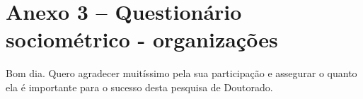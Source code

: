 \documentclass[a4paper, 12pt, openright, oneside, german, french, english, brazil]{abntex2}
\begin{document}
	

	
	
	
	\chapter*[Anexo 3]{Anexo 3 -- Questionário sociométrico - organizações}

	
	
	Bom dia. Quero agradecer muitíssimo pela sua participação e assegurar o quanto ela é importante para o sucesso desta pesquisa de Doutorado.
	
\end{document}
